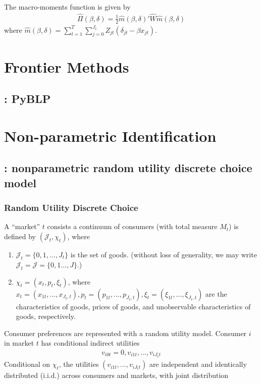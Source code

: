 \documentclass[11pt]{elegantbook}
\begin{document}
The macro-moments function is given by
\begin{equation}
    \begin{aligned}
        \hat{\Pi}(\beta,\delta)=\frac{1}{2}\hat{m}(\beta,\delta)'\hat{W}\hat{m}(\beta,\delta)
    \end{aligned}
    \nonumber
\end{equation}
where $\hat{m}(\beta,\delta)=\sum_{t=1}^T\sum_{j=0}^{J_t}Z_{jt}(\delta_{jt}-\beta x_{jt})$.


\chapter{Frontier Methods}
\section{\cite{conlon2020best}: PyBLP}






\chapter{Non-parametric Identification}
\section{\cite{berry2014identification}:  nonparametric random utility discrete choice model}
\subsection{Random Utility Discrete Choice}
A ``market'' $t$ consists a continuum of consumers (with total measure $M_t$) is defined by $(\mathcal{J}_t,\chi_t)$, where
\begin{enumerate}
    \item $\mathcal{J}_t=\{0,1,...,J_t\}$ is the set of goods. (without loss of generality, we may write $\mathcal{J}_t=\mathcal{J}=\{0,1...,J\}$.)
    \item $\chi_t=(x_t,p_t,\xi_t)$, where $x_t=(x_{1t},...,x_{J_t,t}), p_t=(p_{1t},...,p_{J_t,t}), \xi_t=(\xi_{1t},..., \xi_{J_t,t})$ are the characteristics of goods, prices of goods, and unobservable characteristics of goods, respectively.
\end{enumerate}
Consumer preferences are represented with a random utility model. Consumer $i$ in market $t$ has conditional indirect utilities
\begin{equation}
    \begin{aligned}
        v_{i0t}=0, v_{i1t}, ..., v_{iJ_tt}
    \end{aligned}
    \nonumber
\end{equation}
Conditional on $\chi_t$, the utilities $(v_{i1t}, ..., v_{iJ_tt})$ are independent and identically distributed (i.i.d.) across consumers and markets, with joint distribution


\end{document}
